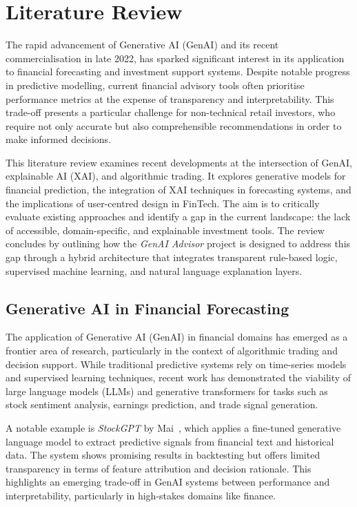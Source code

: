 \section{Literature Review}

The rapid advancement of Generative AI (GenAI) and its recent commercialisation in late 2022, has sparked significant interest in its application to financial forecasting and investment support systems. Despite notable progress in predictive modelling, current financial advisory tools often prioritise performance metrics at the expense of transparency and interpretability. This trade-off presents a particular challenge for non-technical retail investors, who require not only accurate but also comprehensible recommendations in order to make informed decisions.

This literature review examines recent developments at the intersection of GenAI, explainable AI (XAI), and algorithmic trading. It explores generative models for financial prediction, the integration of XAI techniques in forecasting systems, and the implications of user-centred design in FinTech. The aim is to critically evaluate existing approaches and identify a gap in the current landscape: the lack of accessible, domain-specific, and explainable investment tools. The review concludes by outlining how the \textit{GenAI Advisor} project is designed to address this gap through a hybrid architecture that integrates transparent rule-based logic, supervised machine learning, and natural language explanation layers.

\subsection{Generative AI in Financial Forecasting}

The application of Generative AI (GenAI) in financial domains has emerged as a frontier area of research, particularly in the context of algorithmic trading and decision support. While traditional predictive systems rely on time-series models and supervised learning techniques, recent work has demonstrated the viability of large language models (LLMs) and generative transformers for tasks such as stock sentiment analysis, earnings prediction, and trade signal generation.

A notable example is \textit{StockGPT} by Mai~\cite{mai2024stockgpt}, which applies a fine-tuned generative language model to extract predictive signals from financial text and historical data. The system shows promising results in backtesting but offers limited transparency in terms of feature attribution and decision rationale. This highlights an emerging trade-off in GenAI systems between performance and interpretability, particularly in high-stakes domains like finance.

